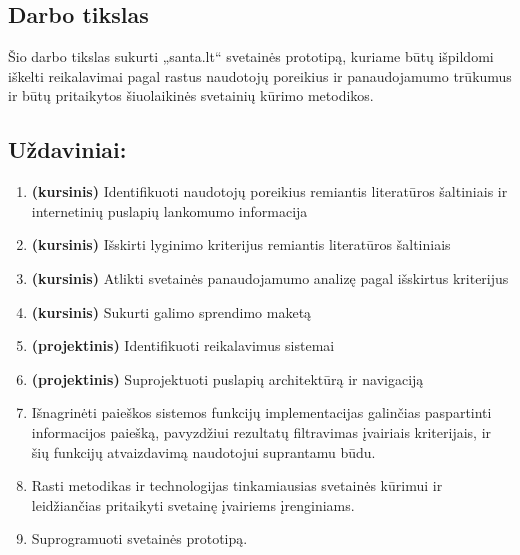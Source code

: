 \documentclass{VUMIFPSkursinis}
\begin{document}


\subsection*{Darbo tikslas}
Šio darbo tikslas sukurti „santa.lt“ svetainės prototipą, kuriame būtų išpildomi iškelti reikalavimai pagal rastus naudotojų poreikius ir panaudojamumo trūkumus ir būtų pritaikytos šiuolaikinės svetainių kūrimo metodikos.

\subsection*{Uždaviniai:}
\begin{enumerate}
\item \textbf{(kursinis)} Identifikuoti naudotojų poreikius remiantis literatūros šaltiniais ir internetinių puslapių lankomumo informacija
\item \textbf{(kursinis)} Išskirti lyginimo kriterijus remiantis literatūros šaltiniais
\item \textbf{(kursinis)} Atlikti svetainės panaudojamumo analizę pagal išskirtus kriterijus
\item \textbf{(kursinis)} Sukurti galimo sprendimo maketą

\item \textbf{(projektinis)} Identifikuoti reikalavimus sistemai
\item \textbf{(projektinis)} Suprojektuoti puslapių architektūrą ir navigaciją

\item Išnagrinėti paieškos sistemos funkcijų implementacijas galinčias paspartinti informacijos paiešką, pavyzdžiui rezultatų filtravimas įvairiais kriterijais, ir šių funkcijų atvaizdavimą naudotojui suprantamu būdu.
\item Rasti metodikas ir technologijas tinkamiausias svetainės kūrimui ir leidžiančias pritaikyti svetainę įvairiems įrenginiams.
\item Suprogramuoti svetainės prototipą.
\end{enumerate}
\end{document}
